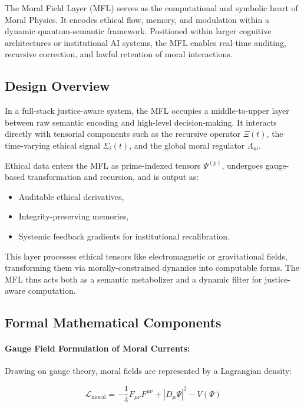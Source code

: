 \documentclass{article}
\theoremstyle{plain}
\theoremstyle{claimstyle}
\begin{document}
The Moral Field Layer (MFL) serves as the computational and symbolic heart of Moral Physics. It encodes ethical flow, memory, and modulation within a dynamic quantum-semantic framework. Positioned within larger cognitive architectures or institutional AI systems, the MFL enables real-time auditing, recursive correction, and lawful retention of moral interactions.

\subsection{Design Overview}

In a full-stack justice-aware system, the MFL occupies a middle-to-upper layer between raw semantic encoding and high-level decision-making. It interacts directly with tensorial components such as the recursive operator \(\Xi(t)\), the time-varying ethical signal \(\Sigma_i(t)\), and the global moral regulator \(\Lambda_m\).

Ethical data enters the MFL as prime-indexed tensors \(\Psi^{(p)}\), undergoes gauge-based transformation and recursion, and is output as:
\begin{itemize}
    \item Auditable ethical derivatives,
    \item Integrity-preserving memories,
    \item Systemic feedback gradients for institutional recalibration.
\end{itemize}

This layer processes ethical tensors like electromagnetic or gravitational fields, transforming them via morally-constrained dynamics into computable forms. The MFL thus acts both as a semantic metabolizer and a dynamic filter for justice-aware computation.

\subsection{Formal Mathematical Components}

\paragraph{Gauge Field Formulation of Moral Currents:}

Drawing on gauge theory, moral fields are represented by a Lagrangian density:

\[
\mathcal{L}_{\text{moral}} = -\frac{1}{4}F_{\mu\nu}F^{\mu\nu} + |D_\mu\Psi|^2 - V(\Psi)
\]
\end{document}
